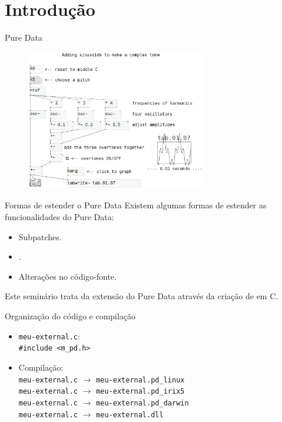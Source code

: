 \section{Introdução}

\begin{frame}{Pure Data}
\begin{figure}
\centering
\includegraphics[width=0.7\textwidth]{../images/pd-facil}
\end{figure}
\end{frame}


\begin{frame}{Formas de estender o Pure Data}
Existem algumas formas de estender as funcionalidades do Pure Data:
\begin{itemize}
\item Subpatches.
\item {}.
\item Alterações no código-fonte.
\end{itemize}
\pause
\vspace{1em}
Este seminário trata da extensão do Pure Data através da criação de
\externals em C.
\end{frame}


\begin{frame}[fragile]{Organização do código e compilação}
\begin{itemize}
\item \texttt{meu-external.c}: \\
  \hspace{1em}\texttt{\#include <m\_pd.h>}
\item Compilação: \\
  \hspace{1em}\texttt{meu-external.c} $\rightarrow$ \texttt{meu-external.pd\_linux} \\
  \hspace{1em}\texttt{meu-external.c} $\rightarrow$ \texttt{meu-external.pd\_irix5} \\
  \hspace{1em}\texttt{meu-external.c} $\rightarrow$ \texttt{meu-external.pd\_darwin} \\
  \hspace{1em}\texttt{meu-external.c} $\rightarrow$ \texttt{meu-external.dll} \\
\end{itemize}
\end{frame}


